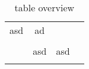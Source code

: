 \begin{table} 
    \begin{tabular}{ c c c c }
        asd & ad &  &  \\ 
         &  &  &  \\ 
         & asd & asd &  \\ 
         &  &  &  \\ 
    \end{tabular} 
    \caption{table overview} 
\end{table}